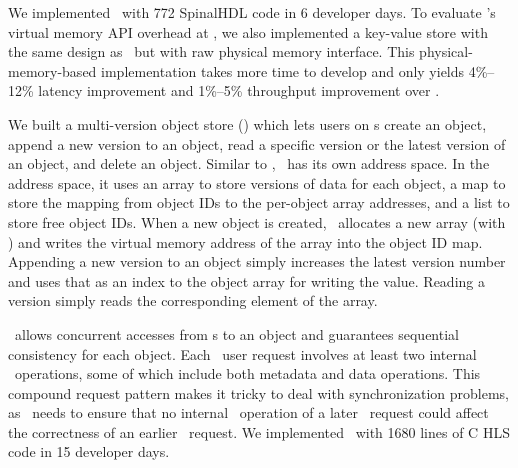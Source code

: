 We implemented \syskv\ with 772 SpinalHDL code in 6 developer days.
To evaluate \sys's virtual memory API overhead at \sysboard, we also implemented a key-value store with the same design as \syskv\ but with raw physical memory interface.
This physical-memory-based implementation takes more time to develop and only yields 4\%–12\% latency improvement and 1\%–5\% throughput improvement over \syskv. %



We built a multi-version object store ({\em \sysmv}) which lets users on \CN{}s create an object, append a new version to an object, 
read a specific version  or the latest version of an object, and delete an object.
Similar to \syskv, \sysmv\ has its own address space.
In the address space, it uses an array to store versions of data for each object, a map to store the mapping from object IDs to the per-object array addresses, and a list to store free object IDs. 
When a new object is created, \sysmv\ allocates a new array (with \alloc) 
and writes the virtual memory address of the array into the object ID map.
Appending a new version to an object simply increases the latest version number
and uses that as an index to the object array for writing the value.
Reading a version simply reads the corresponding element of the array.

\sysmv\ allows concurrent accesses from \CN{}s to an object and guarantees sequential consistency for each object.
Each \sysmv\ user request involves at least two internal
\sys\ operations, some of which include both metadata and
data operations. This compound request pattern makes it tricky
to deal with synchronization problems, as \sysmv\ needs to
ensure that no internal \sys\ operation of a later \sysmv\ request could affect the correctness of an earlier \sysmv\ request. 
We implemented \sysmv\ with 1680 lines of C HLS code in 15 developer days.
 
